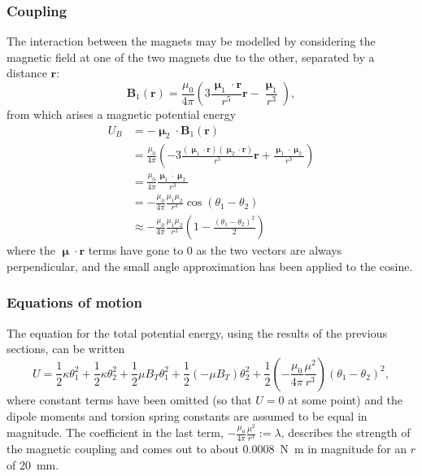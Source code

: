 \documentclass{article}
\begin{document}
\subsubsection{Coupling}
The interaction between the magnets may be modelled by considering the magnetic field at one of the two magnets due to the other, separated by a distance $\mathbf{r}$:
\begin{equation*}
  \mathbf{B}_1(\mathbf{r}) = \frac{\mu_0}{4\pi}\left( 3\frac{\bm{\upmu}_1\cdot\mathbf{r}}{r^5}\mathbf{r} - \frac{\bm{\upmu}_1}{r^3} \right),
\end{equation*}
from which arises a magnetic potential energy
\begin{equation*}
  \begin{aligned}
    U_B &= -\bm{\upmu}_2\cdot \mathbf{B}_1(\mathbf{r}) \\
    &= \frac{\mu_0}{4\pi}\left( -3\frac{(\bm{\upmu}_1\cdot\mathbf{r})(\bm{\upmu}_2\cdot\mathbf{r})}{r^5}\mathbf{r} + \frac{\bm{\upmu}_1\cdot\bm{\upmu}_2}{r^3} \right) \\
    &= \frac{\mu_0}{4\pi}\frac{\bm{\upmu}_1\cdot\bm{\upmu}_2}{r^3} \\
    &= -\frac{\mu_0}{4\pi}\frac{\mu_1\mu_2}{r^3}\cos(\theta_1 - \theta_2) \\
    &\approx -\frac{\mu_0}{4\pi}\frac{\mu_1\mu_2}{r^3} \left( 1 - \frac{(\theta_1 - \theta_2)^2}{2} \right)
  \end{aligned}
\end{equation*}
where the $\bm{\upmu}\cdot \mathbf{r}$ terms have gone to 0 as the two vectors are always perpendicular, and the small angle approximation has been applied to the cosine.

\subsubsection{Equations of motion}
The equation for the total potential energy, using the results of the previous sections, can be written
\begin{equation*}
  U = \frac{1}{2}\kappa\theta_1^2 + \frac{1}{2}\kappa\theta_2^2+ \frac{1}{2}\mu B_T\theta_1^2 + \frac{1}{2}\left( -\mu B_T \right)\theta_2^2 + \frac{1}{2}\left( -\frac{\mu_0}{4\pi}\frac{\mu^2}{r^3} \right)\left( \theta_1 - \theta_2 \right)^2,
\end{equation*}
where constant terms have been omitted (so that $U=0$ at some point) and the dipole moments and torsion spring constants are assumed to be equal in magnitude.
The coefficient in the last term, $-\frac{\mu_0}{4\pi}\frac{\mu^2}{r^3} := \lambda$, describes the strength of the magnetic coupling and comes out to about \qty{0.0008}{N.m} in magnitude for an $r$ of \qty{20}{mm}.
\end{document}
